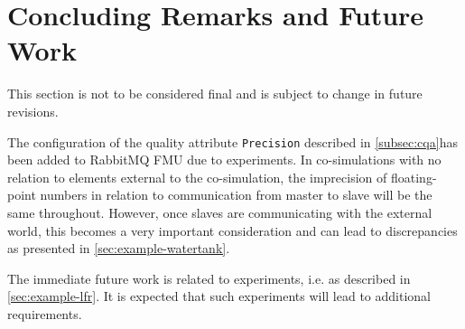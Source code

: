 \section{Concluding Remarks and Future Work}\label{sec:conclusion-future_work}
This section is not to be considered final and is subject to change in future revisions.

The configuration of the quality attribute \texttt{Precision} described in \cref{subsec:cqa}has been added to
RabbitMQ FMU due to experiments. In co-simulations with no relation to elements
external to the co-simulation, the imprecision of floating-point numbers in
relation to communication from master to slave will be the same throughout.
However, once slaves are communicating with the external world, this becomes a
very important consideration and can lead to discrepancies as presented in \cref{sec:example-watertank}.

The immediate future work is related to experiments, i.e. as described in
\cref{sec:example-lfr}. It is expected that such experiments will lead to
additional requirements.


